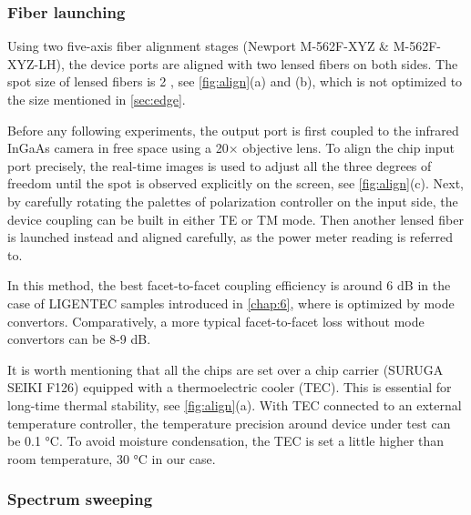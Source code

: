 \begin{figure}
	\centering
	
	\label{fig:align}
\end{figure}

\subsubsection{Fiber launching} 

Using two five-axis fiber alignment stages (Newport M-562F-XYZ \& M-562F-XYZ-LH), the device ports are aligned with two lensed fibers on both sides. The spot size of lensed fibers is 2 \um, see \autoref{fig:align}(a) and (b), which is not optimized to the size mentioned in \autoref{sec:edge}. 

Before any following experiments, the output port is first coupled to the infrared InGaAs camera in free space using a 20$\times$ objective lens. To align the chip input port precisely, the real-time images is used to adjust all the three degrees of freedom until the spot is observed explicitly on the screen, see \autoref{fig:align}(c). Next, by carefully rotating the palettes of polarization controller on the input side, the device coupling can be built in either TE or TM mode. Then another lensed fiber is launched instead and aligned carefully, as the power meter reading is referred to.

In this method, the best facet-to-facet coupling efficiency is around 6 dB in the case of LIGENTEC samples introduced in \autoref{chap:6}, where is optimized by mode convertors. Comparatively, a more typical facet-to-facet loss without mode convertors can be 8-9 dB.

It is worth mentioning that all the chips are set over a chip carrier (SURUGA SEIKI F126) equipped with a thermoelectric cooler (TEC). This is essential for long-time thermal stability, see \autoref{fig:align}(a).
With TEC connected to an external temperature controller, the temperature precision around device under test can be 0.1 \si{\celsius}.
To avoid moisture condensation, the TEC is set a little higher than room temperature, 30 \si{\celsius} in our case. 

\subsubsection{Spectrum sweeping}

